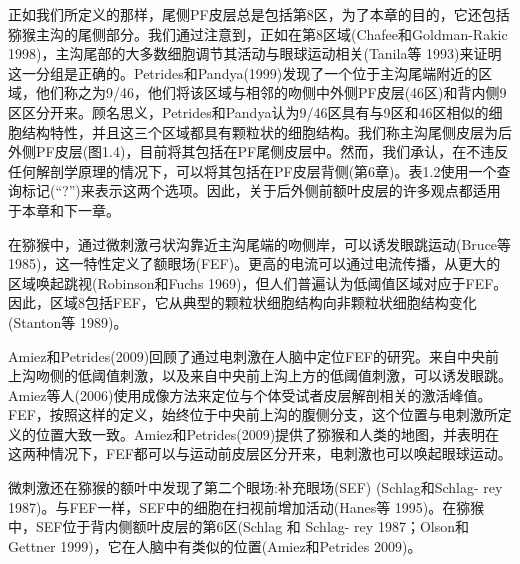 正如我们所定义的那样，尾侧PF皮层总是包括第8区，为了本章的目的，它还包括猕猴主沟的尾侧部分。我们通过注意到，正如在第8区域(Chafee和Goldman-Rakic 1998)，主沟尾部的大多数细胞调节其活动与眼球运动相关(Tanila等 1993)来证明这一分组是正确的。Petrides和Pandya(1999)发现了一个位于主沟尾端附近的区域，他们称之为9/46，他们将该区域与相邻的吻侧中外侧PF皮层(46区)和背内侧9区区分开来。顾名思义，Petrides和Pandya认为9/46区具有与9区和46区相似的细胞结构特性，并且这三个区域都具有颗粒状的细胞结构。我们称主沟尾侧皮层为后外侧PF皮层(图1.4)，目前将其包括在PF尾侧皮层中。然而，我们承认，在不违反任何解剖学原理的情况下，可以将其包括在PF皮层背侧(第6章)。表1.2使用一个查询标记(“?”)来表示这两个选项。因此，关于后外侧前额叶皮层的许多观点都适用于本章和下一章。

在猕猴中，通过微刺激弓状沟靠近主沟尾端的吻侧岸，可以诱发眼跳运动(Bruce等 1985)，这一特性定义了额眼场(FEF)。更高的电流可以通过电流传播，从更大的区域唤起跳视(Robinson和Fuchs 1969)，但人们普遍认为低阈值区域对应于FEF。因此，区域8包括FEF，它从典型的颗粒状细胞结构向非颗粒状细胞结构变化(Stanton等 1989)。

Amiez和Petrides(2009)回顾了通过电刺激在人脑中定位FEF的研究。来自中央前上沟吻侧的低阈值刺激，以及来自中央前上沟上方的低阈值刺激，可以诱发眼跳。Amiez等人(2006)使用成像方法来定位与个体受试者皮层解剖相关的激活峰值。FEF，按照这样的定义，始终位于中央前上沟的腹侧分支，这个位置与电刺激所定义的位置大致一致。Amiez和Petrides(2009)提供了猕猴和人类的地图，并表明在这两种情况下，FEF都可以与运动前皮层区分开来，电刺激也可以唤起眼球运动。

微刺激还在猕猴的额叶中发现了第二个眼场:补充眼场(SEF) (Schlag和Schlag- rey 1987)。与FEF一样，SEF中的细胞在扫视前增加活动(Hanes等 1995)。在猕猴中，SEF位于背内侧额叶皮层的第6区(Schlag 和 Schlag- rey 1987；Olson和Gettner 1999)，它在人脑中有类似的位置(Amiez和Petrides 2009)。
